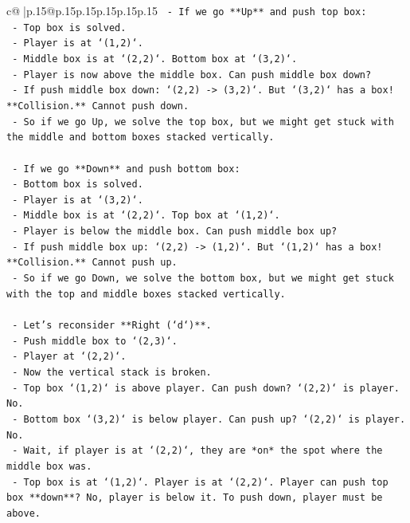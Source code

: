 \documentclass{article}
\begin{document}
{\begin{supertabular}{c@{$\;$}|p{.15\linewidth}@{}p{.15\linewidth}p{.15\linewidth}p{.15\linewidth}p{.15\linewidth}p{.15\linewidth}}
{{{\texttt{    {-} If we go **Up** and push top box:} \\
\texttt{        {-} Top box is solved.} \\
\texttt{        {-} Player is at `(1,2)`.} \\
\texttt{        {-} Middle box is at `(2,2)`. Bottom box at `(3,2)`.} \\
\texttt{        {-} Player is now above the middle box. Can push middle box down?} \\
\texttt{        {-} If push middle box down: `(2,2) {-}> (3,2)`. But `(3,2)` has a box! **Collision.** Cannot push down.} \\
\texttt{        {-} So if we go Up, we solve the top box, but we might get stuck with the middle and bottom boxes stacked vertically.} \\
\\ 
\texttt{    {-} If we go **Down** and push bottom box:} \\
\texttt{        {-} Bottom box is solved.} \\
\texttt{        {-} Player is at `(3,2)`.} \\
\texttt{        {-} Middle box is at `(2,2)`. Top box at `(1,2)`.} \\
\texttt{        {-} Player is below the middle box. Can push middle box up?} \\
\texttt{        {-} If push middle box up: `(2,2) {-}> (1,2)`. But `(1,2)` has a box! **Collision.** Cannot push up.} \\
\texttt{        {-} So if we go Down, we solve the bottom box, but we might get stuck with the top and middle boxes stacked vertically.} \\
\\ 
\texttt{    {-} Let's reconsider **Right (`d`)**.} \\
\texttt{        {-} Push middle box to `(2,3)`.} \\
\texttt{        {-} Player at `(2,2)`.} \\
\texttt{        {-} Now the vertical stack is broken.} \\
\texttt{        {-} Top box `(1,2)` is above player. Can push down? `(2,2)` is player. No.} \\
\texttt{        {-} Bottom box `(3,2)` is below player. Can push up? `(2,2)` is player. No.} \\
\texttt{        {-} Wait, if player is at `(2,2)`, they are *on* the spot where the middle box was.} \\
\texttt{        {-} Top box is at `(1,2)`. Player is at `(2,2)`. Player can push top box **down**? No, player is below it. To push down, player must be above.} \\
}}}
\end{supertabular}}
\end{document}
